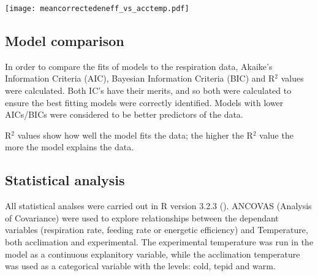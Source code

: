\documentclass[../../Paper.tex]{subfiles}
\begin{document}
\begin{figure*}[!t]
\centering
\texttt{[image: meancorrectedeneff\_vs\_acctemp.pdf]}
\caption{Energetic efficiency of \textit{R. balthica} plotted against acclimation temperature. Tepid (14.3\degree C) and
warm (19.3\degree C) acclimation differed significantly (p \textless 0.01), whilst cold (9.6\degree C)/warm
and cold/tepid returned non-significant results
( p \textgreater 0.08).}
\end{figure*}

\subsection*{Model comparison}

In order to compare the fits of models to
the respiration data, Akaike’s Information Criteria (AIC), Bayesian Information Criteria 
(BIC) and R$^2$ values were calculated. Both IC's have their 
merits, and so both were calculated to ensure the best fitting 
models were correctly identified. Models with lower AICs/BICs were considered 
to be better predictors of the data.

R$^2$ values show how well the model fits the data; the higher the R$^2$ value 
the more the model explains the data.



\subsection*{Statistical analysis}

All statistical analses were carried out in R version 3.2.3 (\cite{r_core_team_r:_2013}).
ANCOVAS (Analysis of Covariance) were used to explore relationships between the 
dependant variables (respiration rate, feeding rate or energetic efficiency) and Temperature, 
both acclimation and experimental. The experimental temperature was run in the
model as a continuous explanitory variable, while the acclimation temperature
was used as a categorical variable with the levels: cold, tepid and warm. 
\end{document}
